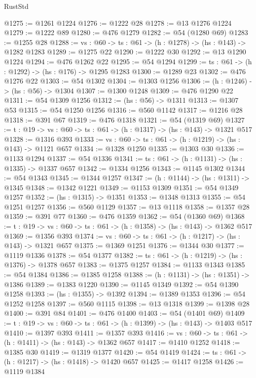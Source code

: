 \begin{lexlean}{RustStd}
\begin{coremodule}
@1275 := @1261 @1224
@1276 := @1222 @28
@1278 := @13 @1276 @1224
@1279 := @1222 @89
@1280 := @476 @1279
@1282 := @54 (@1280 @69)
@1283 := @1255 @28
@1288 := {vs : @60} -> {ts : @61} -> (h : @1278) -> (hs : @143) -> @1282 @1283
@1289 := @1275 @22
@1290 := @1222 @30
@1292 := @13 @1290 @1224
@1294 := @476 @1262 @22
@1295 := @54 @1294
@1299 := {ts : @61} -> (h : @1292) -> (hs : @176) -> @1295 @1283
@1300 := @1289 @23
@1302 := @476 @1276 @22
@1303 := @54 @1302
@1304 := @1303 @1256
@1306 := (h : @1246) -> (hs : @56) -> @1304
@1307 := @1300 @1248
@1309 := @476 @1290 @22
@1311 := @54 @1309 @1256
@1312 := (hs : @56) -> @1311
@1313 := @1307 @53
@1315 := @54 @1250 @1256
@1316 := @560 @1142
@1317 := @1216 @28
@1318 := @391 @67
@1319 := @476 @1318
@1321 := @54 (@1319 @69)
@1327 := {t : @19} -> {vs : @60} -> {ts : @61} -> (h : @1317) -> (hs : @143) -> @1321 @517
@1328 := @1316 @393
@1333 := {vs : @60} -> {ts : @61} -> (h : @1219) -> (hs : @143) -> @1121 @657
@1334 := @1328 @1250
@1335 := @1303 @30
@1336 := @1133 @1294
@1337 := @54 @1336
@1341 := {ts : @61} -> (h : @1131) -> (hs : @1335) -> @1337 @657
@1342 := @1334 @1256
@1343 := @1145 @1302
@1344 := @54 @1343
@1345 := @1344 @1257
@1347 := (h : @1144) -> (hs : @1311) -> @1345
@1348 := @1342 @1221
@1349 := @1153 @1309
@1351 := @54 @1349 @1257
@1352 := (hs : @1315) -> @1351
@1353 := @1348 @1313
@1355 := @54 @1251 @1257
@1356 := @560 @1129
@1357 := @13 @1118
@1358 := @1357 @28
@1359 := @391 @77
@1360 := @476 @1359
@1362 := @54 (@1360 @69)
@1368 := {t : @19} -> {vs : @60} -> {ts : @61} -> (h : @1358) -> (hs : @143) -> @1362 @517
@1369 := @1356 @393
@1374 := {vs : @60} -> {ts : @61} -> (h : @1217) -> (hs : @143) -> @1321 @657
@1375 := @1369 @1251
@1376 := @1344 @30
@1377 := @1119 @1336
@1378 := @54 @1377
@1382 := {ts : @61} -> (h : @1219) -> (hs : @1376) -> @1378 @657
@1383 := @1375 @1257
@1384 := @1133 @1343
@1385 := @54 @1384
@1386 := @1385 @1258
@1388 := (h : @1131) -> (hs : @1351) -> @1386
@1389 := @1383 @1220
@1390 := @1145 @1349
@1392 := @54 @1390 @1258
@1393 := (hs : @1355) -> @1392
@1394 := @1389 @1353
@1396 := @54 @1252 @1258
@1397 := @560 @1115
@1398 := @13 @1318
@1399 := @1398 @28
@1400 := @391 @84
@1401 := @476 @1400
@1403 := @54 (@1401 @69)
@1409 := {t : @19} -> {vs : @60} -> {ts : @61} -> (h : @1399) -> (hs : @143) -> @1403 @517
@1410 := @1397 @393
@1411 := @1357 @393
@1416 := {vs : @60} -> {ts : @61} -> (h : @1411) -> (hs : @143) -> @1362 @657
@1417 := @1410 @1252
@1418 := @1385 @30
@1419 := @1319 @1377
@1420 := @54 @1419
@1424 := {ts : @61} -> (h : @1217) -> (hs : @1418) -> @1420 @657
@1425 := @1417 @1258
@1426 := @1119 @1384

\end{coremodule}
\end{lexlean}
